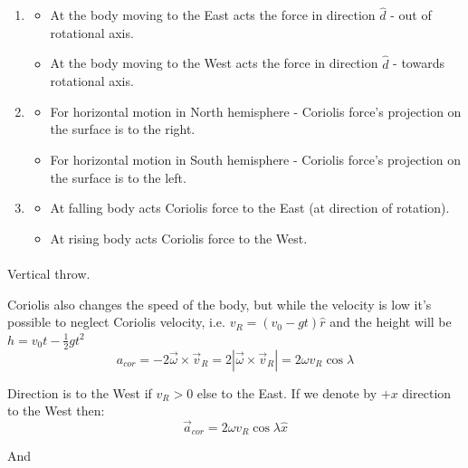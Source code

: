 \begin{enumerate}
	\item \begin{itemize}
		\item At the body moving to the East acts the force in direction $\hat{d}$ - out of rotational axis.
		
		\item At the body moving to the West acts the force in direction $\hat{d}$ - towards rotational axis.
	\end{itemize}
 
 
 
 \item \begin{itemize}
 	\item 
 	For horizontal motion in North hemisphere - Coriolis force's projection on the surface is to the right.
 	
 	\item 
 	For horizontal motion in South hemisphere - Coriolis force's projection on the surface is to the left.
 \end{itemize}
 



\item \begin{itemize}
	\item 
	
	At falling body acts Coriolis force to the East (at direction of rotation).
	
	\item 
	At rising body acts Coriolis force to the West.
\end{itemize}
\end{enumerate}

\paragraph{} Vertical throw.

Coriolis also changes the speed of the body, but while the velocity is low it's possible to neglect Coriolis velocity, i.e. $v_R=(v_0-gt)\hat{r}$ and the height will be $h = v_0 t - \frac{1}{2}gt^2$
$$a_{cor} = -2\vec{\omega} \times \vec{v}_R = 2 \left| \vec{\omega} \times \vec{v}_R  \right| = 2 \omega v_R \cos \lambda$$

Direction is to the West if $v_R>0$ else to the East.
If we denote by $+x$ direction to the West then:
$$\vec{a}_{cor} = 2 \omega v_R \cos \lambda \hat{x}$$

And 

